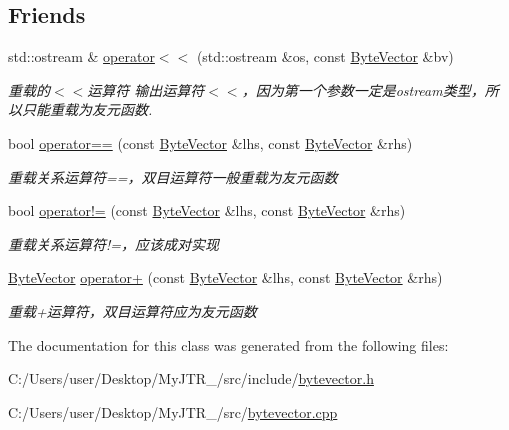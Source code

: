 \subsection*{Friends}
\begin{DoxyCompactItemize}
\item 
\mbox{\label{class_byte_vector_aaa22d9eb63bc8fe37beba211c088743a}} 
std\+::ostream \& \mbox{\hyperlink{class_byte_vector_aaa22d9eb63bc8fe37beba211c088743a}{operator$<$$<$}} (std\+::ostream \&os, const \mbox{\hyperlink{class_byte_vector}{Byte\+Vector}} \&bv)
\begin{DoxyCompactList}\small\item\em 重载的$<$$<$运算符 输出运算符$<$$<$，因为第一个参数一定是ostream类型，所以只能重载为友元函数. \end{DoxyCompactList}\item 
\mbox{\label{class_byte_vector_a8449bdaf5c587bf4e8074338cb76accd}} 
bool \mbox{\hyperlink{class_byte_vector_a8449bdaf5c587bf4e8074338cb76accd}{operator==}} (const \mbox{\hyperlink{class_byte_vector}{Byte\+Vector}} \&lhs, const \mbox{\hyperlink{class_byte_vector}{Byte\+Vector}} \&rhs)
\begin{DoxyCompactList}\small\item\em 重载关系运算符==，双目运算符一般重载为友元函数 \end{DoxyCompactList}\item 
\mbox{\label{class_byte_vector_a1edd8742ac3558c8b9b0215f6e57d19e}} 
bool \mbox{\hyperlink{class_byte_vector_a1edd8742ac3558c8b9b0215f6e57d19e}{operator!=}} (const \mbox{\hyperlink{class_byte_vector}{Byte\+Vector}} \&lhs, const \mbox{\hyperlink{class_byte_vector}{Byte\+Vector}} \&rhs)
\begin{DoxyCompactList}\small\item\em 重载关系运算符!=，应该成对实现 \end{DoxyCompactList}\item 
\mbox{\label{class_byte_vector_a40c2c033496550b8355c4e4c1b963c1d}} 
\mbox{\hyperlink{class_byte_vector}{Byte\+Vector}} \mbox{\hyperlink{class_byte_vector_a40c2c033496550b8355c4e4c1b963c1d}{operator+}} (const \mbox{\hyperlink{class_byte_vector}{Byte\+Vector}} \&lhs, const \mbox{\hyperlink{class_byte_vector}{Byte\+Vector}} \&rhs)
\begin{DoxyCompactList}\small\item\em 重载+运算符，双目运算符应为友元函数 \end{DoxyCompactList}\end{DoxyCompactItemize}


The documentation for this class was generated from the following files\+:\begin{DoxyCompactItemize}
\item 
C\+:/\+Users/user/\+Desktop/\+My\+J\+T\+R\+\_/src/include/\mbox{\hyperlink{bytevector_8h}{bytevector.\+h}}\item 
C\+:/\+Users/user/\+Desktop/\+My\+J\+T\+R\+\_/src/\mbox{\hyperlink{bytevector_8cpp}{bytevector.\+cpp}}\end{DoxyCompactItemize}
